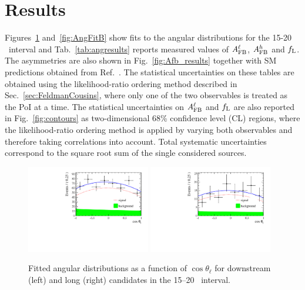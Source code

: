 \section{Results}
\label{sec:afb_results}

Figures~\ref{fig:AngFit} and~\ref{fig:AngFitB} show fits to the angular distributions
for the 15-20 \gevgevcccc ~\qsq interval and 
%
Tab.~\ref{tab:angresults} reports measured values of $A_{\rm FB}^\ell$, $A_{\rm FB}^h$ and $f_{\rm L}$.
The asymmetries are also shown in Fig.~\ref{fig:Afb_results} together with SM predictions obtained from 
Ref.~\cite{Detmold:2012vy}. The statistical uncertainties on these tables 
are obtained using the likelihood-ratio ordering method described in Sec.~\ref{sec:FeldmanCousins}, where only
one of the two observables is treated as the PoI at a time. The statistical uncertainties
on $A_{\rm FB}^\ell$ and $f_{\rm L}$ are also reported in Fig.~\ref{fig:contours} as two-dimensional 68\;\% confidence level (CL) regions,
where the likelihood-ratio ordering method is applied by varying both observables and therefore taking
correlations into account. Total systematic uncertainties correspond to the square root sum of the
single considered sources.
\clearpage
\begin{figure}[t]
\centering
\includegraphics[width=0.48\textwidth]{Lmumu/figs/AngularDistribs/Fitted/Afb_DD_q2_1500_2000.pdf}
\includegraphics[width=0.48\textwidth]{Lmumu/figs/AngularDistribs/Fitted/Afb_LL_q2_1500_2000.pdf}
\caption{Fitted angular distributions as a function of $\cos\theta_\ell$ for downstream
 (left) and long (right) candidates in the 15--20 \gevgevcccc ~\qsq interval.  }
\label{fig:AngFit}
\end{figure}
